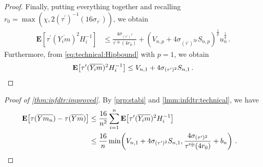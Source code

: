 \documentclass{article}
\newcommand{\lab}{\left[} %
\newcommand{\rab}{\right]} %
\newcommand{\ab}[1]{\lab #1 \rab} %
\newcommand{\abOf}[1]{\!\ab{#1}} %
\newcommand{\lb}{\left(} %
\newcommand{\rb}{\right)} %
\newcommand{\br}[1]{\lb #1 \rb} %
\newcommand{\brOf}[1]{\!\br{#1}} %
\newcommand{\E}{\mathbf{E}} %
\newcommand{\EOf}[1]{\E\abOf{#1}}
\newcommand{\pr}{^\prime}
\newcommand{\eqfs}{\,.}
\newcommand{\ol}[2]{\overline{#1#2}}
\newcommand{\tran}{\tau}
\newcommand{\dtran}{\tau\pr}
\newcommand{\ddrtran}{\tau^{\prime\oplus}}
\newcommand{\invdtran}{(\tau\pr)^{-1}}
\begin{document}
\begin{proof}
    Finally, putting everything together and recalling $r_0 = \max\brOf{\chi, 2 \invdtran\brOf{16 \sigma_{\dtran}}}$, we obtain
    \begin{align}
        \EOf{\dtran(\ol{Y_i}m)^2 H_i^{-1}}
        &\leq
        \frac{4 \sigma_{(\dtran)^2}}{\ddrtran(4r_0)}
        +
        \br{V_{n,p} + 4 \sigma_{(\dtran)^{2p}} S_{n,p}}^{\frac1p} u_n^{\frac1q}
        \eqfs
    \end{align}
    Furthermore, from \eqref{eq:technical:Hipbound} with $p = 1$, we obtain
    \begin{equation}
        \EOf{\dtran(\ol{Y_i}m)^2 H_i^{-1}}
        \leq 
        V_{n,1} + 4 \sigma_{(\dtran)^{2}} S_{n,1}
        \eqfs
        \qedhere
    \end{equation}
\end{proof}
%
%
\begin{proof}[Proof of \cref{thm:infdtr:improved}]
    By \cref{prp:stabi} and \cref{lmm:infdtr:technical}, we have
    \begin{align}
        \EOf{\tran(\ol Y{m_n}) - \tran(\ol Ym)}
        &\leq
        \frac{16}{n^2} \sum_{i=1}^n \EOf{\dtran(\ol {Y_i}m)^2 H_i^{-1}}
        \\&\leq
        \frac{16}{n} \min\brOf{V_{n,1} + 4 \sigma_{(\dtran)^{2}} S_{n,1}, \frac{4 \sigma_{(\dtran)^2}}{\ddrtran(4r_0)}
            +
            b_n}
        \eqfs
        &\qedhere
    \end{align}
\end{proof}
%
%
%
\end{document}

